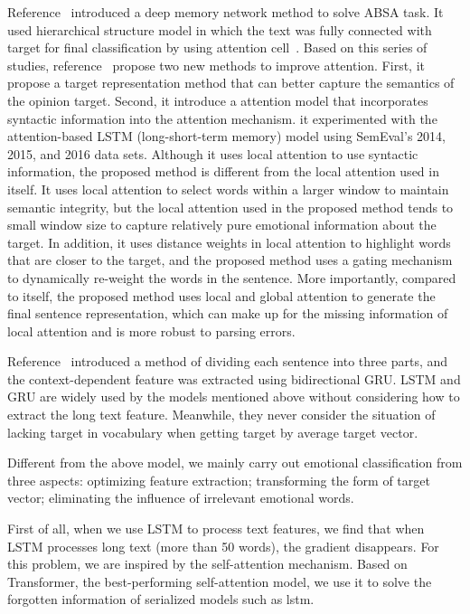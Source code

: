 \documentclass[runningheads, twocolumn]{llncs}
\begin{document}
 Reference~\cite{DBLP:conf/emnlp/TangQL16} introduced a deep memory network method to solve ABSA task. It used hierarchical structure model in which the text was fully connected with target for final classification by using attention cell~\cite{DBLP:conf/cikm/ChengZZKZW17}. Based on this series of studies, reference~\cite{DBLP:conf/coling/HeLND18} propose two new methods to improve attention. First, it propose a target representation method that can better capture the semantics of the opinion target. Second, it introduce a attention model that incorporates syntactic information into the attention mechanism. it experimented with the attention-based LSTM (long-short-term memory) model using SemEval's 2014, 2015, and 2016 data sets. Although it uses local attention to use syntactic information, the proposed method is different from the local attention used in itself. It uses local attention to select words within a larger window to maintain semantic integrity, but the local attention used in the proposed method tends to small window size to capture relatively pure emotional information about the target. In addition, it uses distance weights in local attention to highlight words that are closer to the target, and the proposed method uses a gating mechanism to dynamically re-weight the words in the sentence. More importantly, compared to itself, the proposed method uses local and global attention to generate the final sentence representation, which can make up for the missing information of local attention and is more robust to parsing errors.
 
 Reference~\cite{DBLP:journals/corr/abs-1802-00892} introduced a method of dividing each sentence into three parts, and the context-dependent feature was extracted using bidirectional GRU. LSTM and GRU are widely used by the models mentioned above without considering how to extract the long text feature. Meanwhile, they never consider the situation of lacking target in vocabulary when getting target by average target vector.

Different from the above model, we mainly carry out emotional classification from three aspects: optimizing feature extraction; transforming the form of target vector; eliminating the influence of irrelevant emotional words. 

First of all, when we use LSTM to process text features, we find that when LSTM processes long text (more than 50 words), the gradient disappears. For this problem, we are inspired by the self-attention mechanism. Based on Transformer, the best-performing self-attention model, we use it to solve the forgotten information of serialized models such as lstm. 
\end{document}
